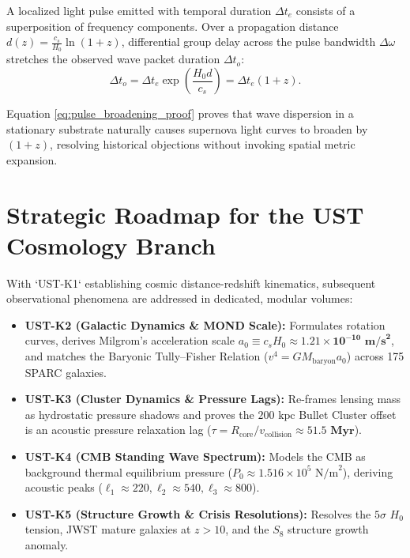 \documentclass[11pt,a4paper]{article}
\begin{document}
	A localized light pulse emitted with temporal duration $\Delta t_e$ consists of a superposition of frequency components. Over a propagation distance $d(z) = \frac{c_s}{H_0} \ln(1+z)$, differential group delay across the pulse bandwidth $\Delta \omega$ stretches the observed wave packet duration $\Delta t_o$:
	\begin{equation}
		\Delta t_o = \Delta t_e \exp\left(\frac{H_0 d}{c_s}\right) = \Delta t_e (1 + z).
		\label{eq:pulse_broadening_proof}
	\end{equation}
	
	Equation \eqref{eq:pulse_broadening_proof} proves that wave dispersion in a stationary substrate naturally causes supernova light curves to broaden by $(1+z)$, resolving historical objections without invoking spatial metric expansion.
	
	\section{Strategic Roadmap for the UST Cosmology Branch}
	\label{sec:cosmo_roadmap}
	
	With `UST-K1` establishing cosmic distance-redshift kinematics, subsequent observational phenomena are addressed in dedicated, modular volumes:
	\begin{itemize}
		\item \textbf{UST-K2 (Galactic Dynamics \& MOND Scale):} Formulates rotation curves, derives Milgrom's acceleration scale $a_0 \equiv c_s H_0 \approx \mathbf{1.21 \times 10^{-10} \text{ m/s}^2}$, and matches the Baryonic Tully--Fisher Relation ($v^4 = G M_{\text{baryon}} a_0$) across 175 SPARC galaxies.
		\item \textbf{UST-K3 (Cluster Dynamics \& Pressure Lags):} Re-frames lensing mass as hydrostatic pressure shadows and proves the $200 \text{ kpc}$ Bullet Cluster offset is an acoustic pressure relaxation lag ($\tau = R_{\text{core}} / v_{\text{collision}} \approx \mathbf{51.5 \text{ Myr}}$).
		\item \textbf{UST-K4 (CMB Standing Wave Spectrum):} Models the CMB as background thermal equilibrium pressure ($P_0 \approx 1.516 \times 10^5 \text{ N/m}^2$), deriving acoustic peaks ($\ell_1 \approx 220, \ell_2 \approx 540, \ell_3 \approx 800$).
		\item \textbf{UST-K5 (Structure Growth \& Crisis Resolutions):} Resolves the $5\sigma$ $H_0$ tension, JWST mature galaxies at $z > 10$, and the $S_8$ structure growth anomaly.
	\end{itemize}
	
\end{document}
